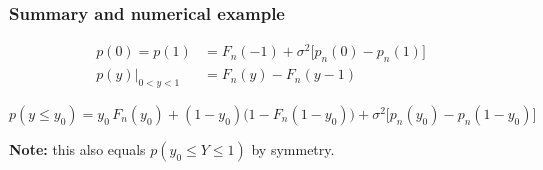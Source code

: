\subsubsection*{Summary and numerical example}

\[
\boxed{
\begin{aligned}
p(0) = p(1)
  &= F_n(-1) + \sigma^2\bigl[p_n(0) - p_n(1)\bigr] \\
p(y)\big|_{0<y<1}
  &= F_n(y) - F_n(y-1)
\end{aligned}
}
\]

\begin{equation}
p(y \leq y_0)
  = y_0\,F_n(y_0)
  + (1-y_0)\bigl(1 - F_n(1-y_0)\bigr)
  + \sigma^2\bigl[p_n(y_0) - p_n(1-y_0)\bigr]
  \label{additiveCDF}
\end{equation}

\textbf{Note:} this also equals $p(y_0 \leq Y \leq 1)$ by symmetry. \\[6pt]



